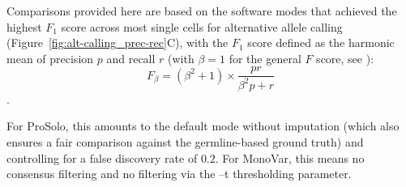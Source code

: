 \documentclass[authoryear,preprint,11pt]{scrartcl}
\begin{document}
Comparisons provided here are based on the software modes that achieved the highest $F_1$ score across most single cells for alternative allele calling (Figure~\ref{fig:alt-calling_prec-rec}C), with the $F_1$ score defined as the harmonic mean of precision $p$ and recall $r$ (with $\beta = 1$ for the general $F$ score, see \cite{van_rijsbergen_evaluation_1979,chinchor_muc-4_1992}):\\

\begin{equation} \label{eq:F_1_score}
  F_{\beta} = (\beta^2 + 1) \times \frac{p r}{\beta^2 p + r}
\end{equation}.

For ProSolo, this amounts to the default mode without imputation (which also ensures a fair comparison against the germline-based ground truth) and controlling for a false discovery rate of $0.2$.
For MonoVar, this means no consensus filtering and no filtering via the {\ttfamily --t} thresholding parameter.\\
\end{document}

